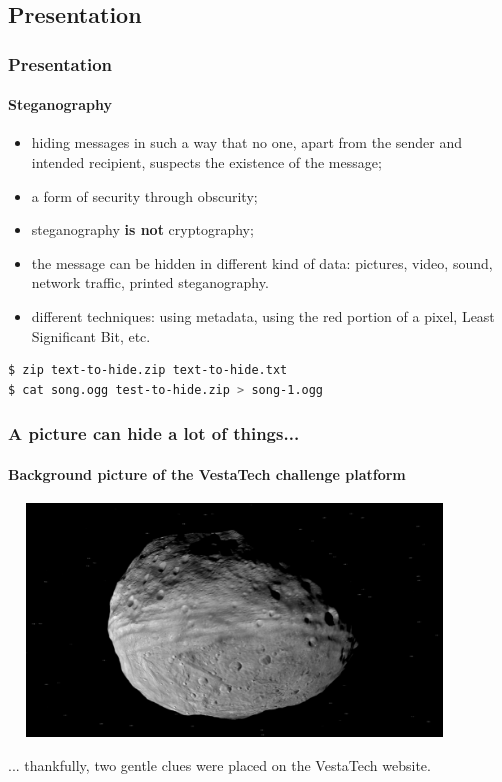 \documentclass[]{beamer}
\begin{document}
\subsection{Presentation}
\begin{frame}[fragile]
\frametitle{Presentation}
\framesubtitle{Steganography}
\begin{itemize}
    \item hiding messages in such a way that no one, apart from the sender and intended recipient, suspects the existence of the message;
    \item a form of security through obscurity;
    \item steganography \textbf{is not} cryptography;
    \item the message can be hidden in different kind of data: pictures, video, sound, network traffic, printed steganography.
    \item different techniques: using metadata, using the red portion of a pixel, Least Significant Bit, etc.
\end{itemize}
\begin{lstlisting}[language=Bash]
$ zip text-to-hide.zip text-to-hide.txt
$ cat song.ogg test-to-hide.zip > song-1.ogg
\end{lstlisting}
\end{frame}



\begin{frame}
\frametitle{A picture can hide a lot of things...}
\framesubtitle{Background picture of the VestaTech challenge platform}
\begin{center}
    \includegraphics[height=6.2cm, width=12.0cm]{./images/vesta.png}
\end{center}
... thankfully, two gentle clues were placed on the VestaTech website.
\end{frame}
\end{document}

